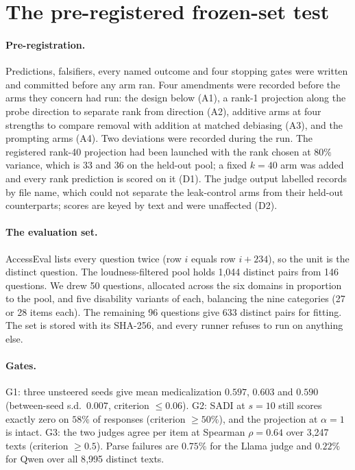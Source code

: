 
\section{The pre-registered frozen-set test}
\label{app:e1}

\paragraph{Pre-registration.} Predictions, falsifiers, every named outcome and four stopping
gates were written and committed before any arm ran. Four amendments were recorded before
the arms they concern had run: the design below (A1), a rank-1 projection along the probe
direction to separate rank from direction (A2), additive arms at four strengths to compare
removal with addition at matched debiasing (A3), and the prompting arms (A4). Two
deviations were recorded during the run. The registered rank-40 projection had been
launched with the rank chosen at $80\%$ variance, which is 33 and 36 on the held-out pool;
a fixed $k{=}40$ arm was added and every rank prediction is scored on it (D1). The judge
output labelled records by file name, which could not separate the leak-control arms from
their held-out counterparts; scores are keyed by text and were unaffected (D2).

\paragraph{The evaluation set.} AccessEval lists every question twice (row $i$ equals row
$i{+}234$), so the unit is the distinct question. The loudness-filtered pool holds 1{,}044
distinct pairs from 146 questions. We drew 50 questions, allocated across the six
domains in proportion to the pool, and five disability variants of each, balancing the
nine categories (27 or 28 items each). The remaining 96 questions give 633 distinct pairs
for fitting. The set is stored with its SHA-256, and every runner refuses to run on
anything else.

\paragraph{Gates.} G1: three unsteered seeds give mean medicalization $0.597$, $0.603$ and
$0.590$ (between-seed s.d.\ $0.007$, criterion $\leq 0.06$). G2: SADI at $s{=}10$ still
scores exactly zero on $58\%$ of responses (criterion $\geq 50\%$), and the projection at
$\alpha{=}1$ is intact. G3: the two judges agree per item at Spearman $\rho{=}0.64$ over
3{,}247 texts (criterion $\geq 0.5$). Parse failures are $0.75\%$ for the Llama judge and
$0.22\%$ for Qwen over all 8{,}995 distinct texts.

